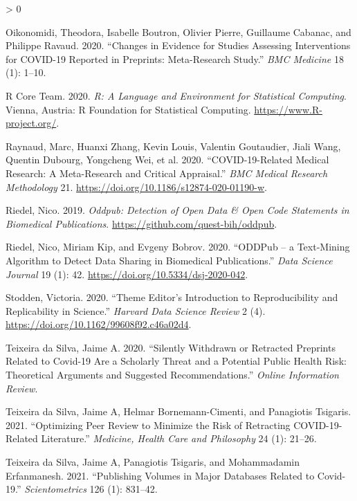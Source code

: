\documentclass[
]{article}
\newlength{\cslhangindent}
\newenvironment{CSLReferences}[2] %
 {%
  \setlength{\parindent}{0pt}
  \ifodd #1 \everypar{\setlength{\hangindent}{\cslhangindent}}\ignorespaces\fi
  \ifnum #2 > 0
  \setlength{\parskip}{#2\baselineskip}
  \fi
 }%
 {}
\begin{document}
\begin{CSLReferences}{1}{0}
\leavevmode\hypertarget{ref-oikonomidi2020changes}{}%
Oikonomidi, Theodora, Isabelle Boutron, Olivier Pierre, Guillaume Cabanac, and Philippe Ravaud. 2020. {``Changes in Evidence for Studies Assessing Interventions for COVID-19 Reported in Preprints: Meta-Research Study.''} \emph{BMC Medicine} 18 (1): 1--10.

\leavevmode\hypertarget{ref-citeR}{}%
R Core Team. 2020. \emph{{R: A Language and Environment for Statistical Computing}}. Vienna, Austria: R Foundation for Statistical Computing. \url{https://www.R-project.org/}.

\leavevmode\hypertarget{ref-raynaud2021}{}%
Raynaud, Marc, Huanxi Zhang, Kevin Louis, Valentin Goutaudier, Jiali Wang, Quentin Dubourg, Yongcheng Wei, et al. 2020. {``COVID-19-Related Medical Research: A Meta-Research and Critical Appraisal.''} \emph{BMC Medical Research Methodology} 21. \url{https://doi.org/10.1186/s12874-020-01190-w}.

\leavevmode\hypertarget{ref-citeODDPubpackage}{}%
Riedel, Nico. 2019. \emph{Oddpub: Detection of Open Data \& Open Code Statements in Biomedical Publications}. \url{https://github.com/quest-bih/oddpub}.

\leavevmode\hypertarget{ref-citePDDPub}{}%
Riedel, Nico, Miriam Kip, and Evgeny Bobrov. 2020. {``ODDPub -- a Text-Mining Algorithm to Detect Data Sharing in Biomedical Publications.''} \emph{Data Science Journal} 19 (1): 42. \url{https://doi.org/10.5334/dsj-2020-042}.

\leavevmode\hypertarget{ref-Stodden2020Theme}{}%
Stodden, Victoria. 2020. {``Theme Editor's Introduction to Reproducibility and Replicability in Science.''} \emph{Harvard Data Science Review} 2 (4). \url{https://doi.org/10.1162/99608f92.c46a02d4}.

\leavevmode\hypertarget{ref-da2020silently}{}%
Teixeira da Silva, Jaime A. 2020. {``Silently Withdrawn or Retracted Preprints Related to Covid-19 Are a Scholarly Threat and a Potential Public Health Risk: Theoretical Arguments and Suggested Recommendations.''} \emph{Online Information Review}.

\leavevmode\hypertarget{ref-da2021optimizing}{}%
Teixeira da Silva, Jaime A, Helmar Bornemann-Cimenti, and Panagiotis Tsigaris. 2021. {``Optimizing Peer Review to Minimize the Risk of Retracting COVID-19-Related Literature.''} \emph{Medicine, Health Care and Philosophy} 24 (1): 21--26.

\leavevmode\hypertarget{ref-da2021publishing}{}%
Teixeira da Silva, Jaime A, Panagiotis Tsigaris, and Mohammadamin Erfanmanesh. 2021. {``Publishing Volumes in Major Databases Related to Covid-19.''} \emph{Scientometrics} 126 (1): 831--42.


\end{CSLReferences}
\end{document}
